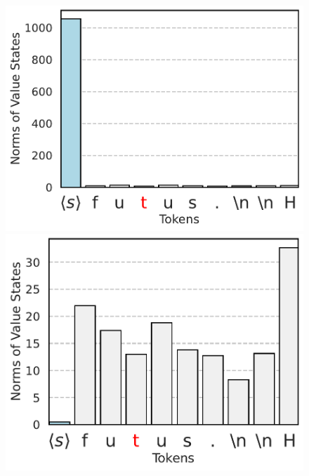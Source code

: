 \begin{figure}[h]
  \centering
  \begin{minipage}{0.3\textwidth}
      \centering
      \vspace{-.2em}
      \includegraphics[width=\linewidth]{Figures/BBM_appendix/value_states_layer_0.pdf}
  \end{minipage}
  \begin{minipage}{0.3\textwidth}
      \centering
      \vspace{-.2em}
      \includegraphics[width=\linewidth]{Figures/BBM_appendix/value_states_layer_1.pdf}

\end{minipage}
\end{figure}
